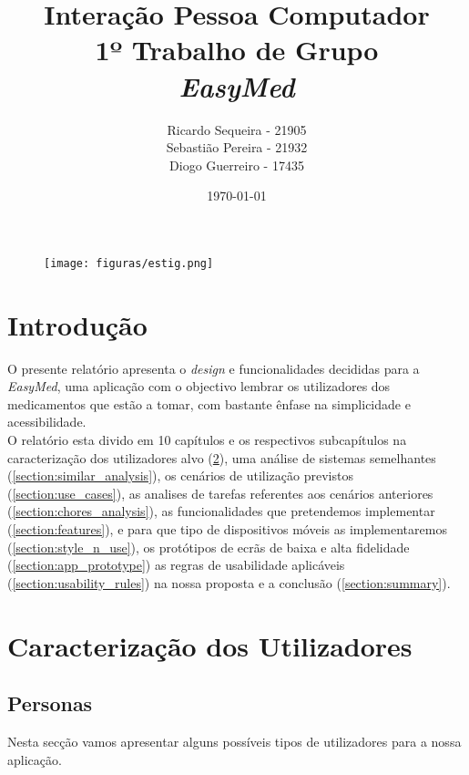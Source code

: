 \documentclass[a4paper]{article}
\begin{document}
\begin{figure}[!t]
    \centering
    \texttt{[image: figuras/estig.png]}
\end{figure}

\title{Interação Pessoa Computador\\1º Trabalho de Grupo\\\textit{EasyMed}}
\author{Ricardo Sequeira - 21905 \\ Sebastião Pereira - 21932 \\ Diogo Guerreiro - 17435}
\date{\today}

\maketitle

\pagebreak

\tableofcontents
\listoffigures

\pagebreak

\section{Introdução}
O presente relatório apresenta o \textit{design} e funcionalidades decididas para a \textit{EasyMed}, uma aplicação com o objectivo lembrar os utilizadores dos medicamentos que estão a tomar, com bastante ênfase na simplicidade e acessibilidade.\\
O relatório esta divido em 10 capítulos e os respectivos subcapítulos na caracterização dos utilizadores alvo (\ref{section:carac_users}), uma análise de sistemas semelhantes (\ref{section:similar_analysis}), os cenários de utilização previstos (\ref{section:use_cases}), as analises de tarefas referentes aos cenários anteriores (\ref{section:chores_analysis}), as funcionalidades que pretendemos implementar (\ref{section:features}), e para que tipo de dispositivos móveis as implementaremos (\ref{section:style_n_use}), os protótipos de ecrãs de baixa e alta fidelidade (\ref{section:app_prototype}) as regras de usabilidade aplicáveis (\ref{section:usability_rules}) na nossa proposta e a conclusão (\ref{section:summary}).

\section{Caracterização dos Utilizadores}\label{section:carac_users}

\subsection{Personas}
Nesta secção vamos apresentar alguns possíveis tipos de utilizadores para a nossa aplicação.
\end{document}
